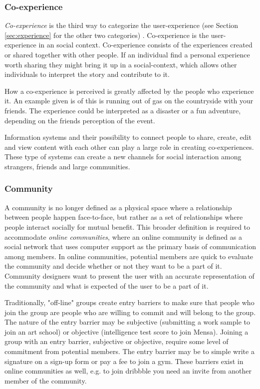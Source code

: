 \subsubsection{Co-experience}
\label{subsubsec:co-experience}

\textit{Co-experience} is the third way to categorize the user-experience (see Section \ref{sec:experience} for the other two categories) \cite{Forlizzi2004}. Co-experience is the user-experience in an social context. Co-experience consists of the experiences created or shared together with other people. If an individual find a personal experience worth sharing they might bring it up in a social-context, which allows other individuals to interpret the story and contribute to it.

How a co-experience is perceived is greatly affected by the people who experience it. An example given is of this is running out of gas on the countryside with your friends. The experience could be interpreted as a disaster or a fun adventure, depending on the friends perception of the event.

Information systems and their possibility to connect people to share, create, edit and view content with each other can play a large role in creating co-experiences. These type of systems can create a new channels for social interaction among strangers, friends and large communities.

\subsubsection{Community}

A community is no longer defined as a physical space where a relationship between people happen face-to-face, but rather as a set of relationships where people interact socially for mutual benefit. This broader definition is required to accommodate \textit{online communities}, where an online community is defined as a social network that uses computer support as the primary basis of communication among members.  In online communities, potential members are quick to evaluate the community and decide whether or not they want to be a part of it. Community designers want to present the user with an accurate representation of the community and what is expected of the user to be a part of it.

Traditionally, "off-line" groups create entry barriers to make sure that people who join the group are people who are willing to commit and will belong to the group. The nature of the entry barrier may be subjective (submitting a work sample to join an art school) or objective (intelligence test score to join Mensa). Joining a group with an entry barrier, subjective or objective, require some level of commitment from potential members. The entry barrier may be to simple write a signature on a sign-up form or pay a fee to join a gym. These barriers exist in online communities as well, e.g. to join dribbble you need an invite from another member of the community.


